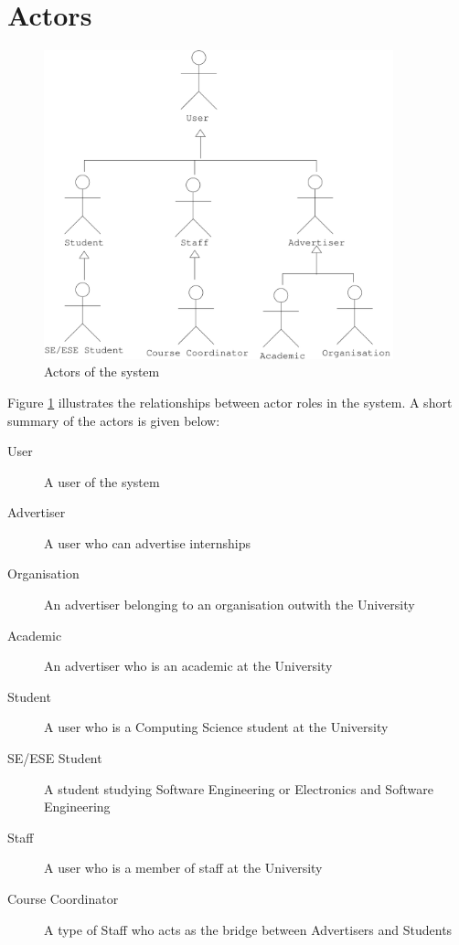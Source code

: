 \section{Actors}
\label{sec:actors}

\begin{figure}[t]
  \label{fig:actors}
  \caption{Actors of the system}
  \begin{center}
    \includegraphics[width=0.9\textwidth]{img/actors.pdf}
  \end{center}
\end{figure}

Figure \ref{fig:actors} illustrates the relationships between actor roles in the system.
A short summary of the actors is given below:

\begin{description}
\item[User]{A user of the system}
\item[Advertiser] {A user who can advertise internships}
\item[Organisation] {An advertiser belonging to an organisation outwith the University}
\item[Academic] {An advertiser who is an academic at the University}
\item[Student] {A user who is a Computing Science student at the University}
\item[SE/ESE Student] {A student studying Software Engineering or Electronics and Software Engineering}
\item[Staff] {A user who is a member of staff at the University}
\item[Course Coordinator] {A type of Staff who acts as the bridge between Advertisers and Students}
\end{description}

